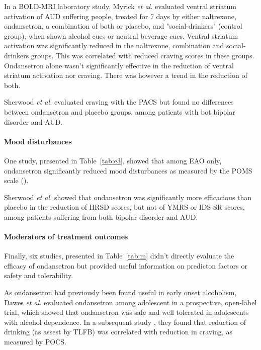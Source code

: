 In a BOLD-MRI laboratory study, Myrick \textit{et al.} \cite{myrick_effect_2008} evaluated ventral striatum activation of AUD suffering people, treated for 7 days by either naltrexone, ondansetron, a combination of both or placebo, and "social-drinkers" (control group), when shown alcohol cues or neutral beverage cues. Ventral striatum activation was significantly reduced in the naltrexone, combination and social-drinkers groups. This was correlated with reduced craving scores in these groups. Ondansetron alone wasn't significantly effective in the reduction of ventral striatum activation nor craving. There was however a trend in the reduction of both.

Sherwood \textit{et al.} \cite{sherwood_brown_randomized_2021} evaluated craving with the PACS but found no differences between ondansetron and placebo groups, among patients with bot bipolar disorder and AUD. 

\paragraph{Mood disturbances}
One study, presented in Table~\ref{tab:e3}, showed that among EAO only, ondansetron significantly reduced mood disturbances as measured by the POMS scale (\cite{mcnair1989profile}).

Sherwood \textit{et al.} \cite{sherwood_brown_randomized_2021} showed that ondansetron was significantly more efficacious than placebo in the reduction of HRSD scores, but not of YMRS or IDS-SR scores, among patients suffering from both bipolar disorder and AUD.

\paragraph{Moderators of treatment outcomes}
Finally, six studies, presented in Table~\ref{tab:m} didn't directly evaluate the efficacy of ondansetron but provided useful information on predicton factors or safety and tolerability.

As ondansetron had previously been found useful in early onset alcoholism, Dawes \textit{et al.} \cite{dawes_prospective_2005} evaluated ondansetron among adolescent in a prospective, open-label trial, which showed that ondansetron was safe and well tolerated in adolescents with alcohol dependence. In a subsequent study \cite{dawes_reductions_2005}, they found that reduction of drinking (as assest by TLFB) was correlated with reduction in craving, as measured by POCS.

